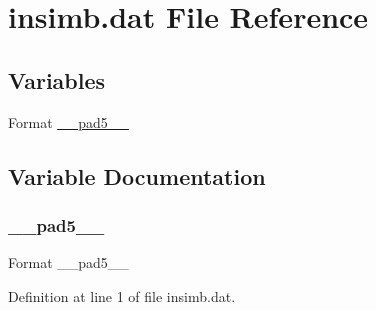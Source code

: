 \hypertarget{insimb_8dat}{}\section{insimb.\+dat File Reference}
\label{insimb_8dat}
\subsection*{Variables}
\begin{DoxyCompactItemize}
\item 
Format \hyperlink{insimb_8dat_a6e9b5f254f3801ccd3e2b5ec97cea875}{\+\_\+\+\_\+pad5\+\_\+\+\_\+}
\end{DoxyCompactItemize}


\subsection{Variable Documentation}
\mbox{\label{insimb_8dat_a6e9b5f254f3801ccd3e2b5ec97cea875}} 
\subsubsection{\texorpdfstring{\+\_\+\+\_\+pad5\+\_\+\+\_\+}{\_\_pad5\_\_}}
{\footnotesize\ttfamily Format \+\_\+\+\_\+pad5\+\_\+\+\_\+}



Definition at line 1 of file insimb.\+dat.

